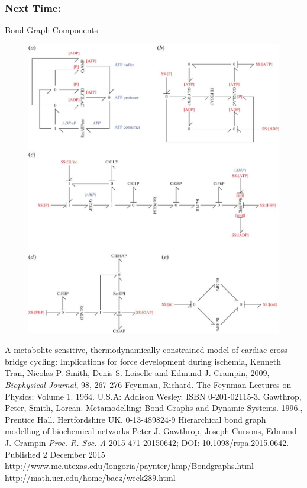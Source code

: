 \documentclass[11pt,reqno]{beamer}
\begin{document}
\begin{frame}
\frametitle{Next Time:}
Bond Graph Components\cite{Gaw2015}
\begin{figure}
	\includegraphics[scale=0.5]{images/F5large.jpg}
\end{figure}


\end{frame}
\begin{thebibliography}{5}
 A metabolite-sensitive, thermodynamically-constrained model of cardiac cross-bridge cycling: Implications for force development during ischemia, Kenneth Tran, Nicolas P. Smith, Denis S. Loiselle and Edmund J. Crampin, 2009, \emph{Biophysical Journal}, 98, 267-276
 Feynman, Richard. The Feynman Lectures on Physics; Volume 1. 1964. U.S.A: Addison Wesley. ISBN 0-201-02115-3.
 Gawthrop, Peter, Smith, Lorcan. Metamodelling: Bond Graphs and Dynamic Systems. 1996.,  Prentice Hall. Hertfordshire UK.
 0-13-489824-9
 Hierarchical bond graph modelling of biochemical networks
 Peter J. Gawthrop, Joseph Cursons, Edmund J. Crampin
 \emph{Proc. R. Soc. A} 2015 471 20150642; DOI: 10.1098/rspa.2015.0642. Published 2 December 2015
  http://www.me.utexas.edu/\~longoria/paynter/hmp/Bondgraphs.html
  http://math.ucr.edu/home/baez/week289.html
 \end{thebibliography}
\end{document}
